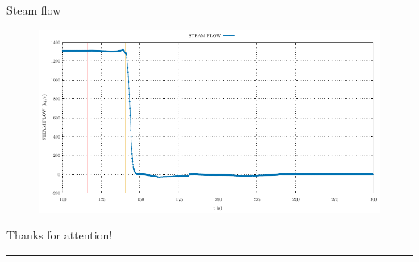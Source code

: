 \begin{frame}{Steam flow}
	\begin{figure}
		\centering
		\includegraphics[width=\textwidth]{./graphs/STEAM FLOW_comp.pdf}
		
	\end{figure}
	
\end{frame}




\begin{frame}
\Large{{Thanks for attention!}}
\vspace{0.5cm}
\hrule
\vspace{3cm}
\end{frame}

\nologo



